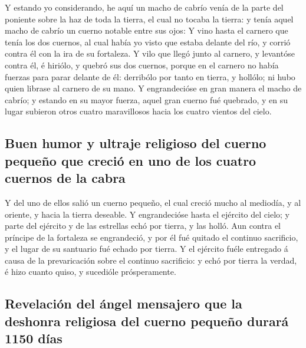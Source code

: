  Y estando yo considerando, he aquí un macho de cabrío
venía de la parte del poniente sobre la haz de toda la tierra, el cual
no tocaba la tierra: y tenía aquel macho de cabrío un cuerno notable
entre sus ojos:  Y vino hasta el carnero que tenía los dos
cuernos, al cual había yo visto que estaba delante del río, y corrió
contra él con la ira de su fortaleza.  Y vilo que llegó
junto al carnero, y levantóse contra él, é hiriólo, y quebró sus dos
cuernos, porque en el carnero no había fuerzas para parar delante de él:
derribólo por tanto en tierra, y hollólo; ni hubo quien librase al
carnero de su mano.  Y engrandecióse en gran manera el
macho de cabrío; y estando en su mayor fuerza, aquel gran cuerno fué
quebrado, y en su lugar subieron otros cuatro maravillosos hacia los
cuatro vientos del cielo.

\hypertarget{buen-humor-y-ultraje-religioso-del-cuerno-pequeuxf1o-que-creciuxf3-en-uno-de-los-cuatro-cuernos-de-la-cabra}{%
\subsection{Buen humor y ultraje religioso del cuerno pequeño que creció
en uno de los cuatro cuernos de la
cabra}\label{buen-humor-y-ultraje-religioso-del-cuerno-pequeuxf1o-que-creciuxf3-en-uno-de-los-cuatro-cuernos-de-la-cabra}}

 Y del uno de ellos salió un cuerno pequeño, el cual
creció mucho al mediodía, y al oriente, y hacia la tierra deseable.
 Y engrandecióse hasta el ejército del cielo; y parte del
ejército y de las estrellas echó por tierra, y las holló.
 Aun contra el príncipe de la fortaleza se engrandeció, y
por él fué quitado el continuo sacrificio, y el lugar de su santuario
fué echado por tierra.  Y el ejército fuéle entregado á
causa de la prevaricación sobre el continuo sacrificio: y echó por
tierra la verdad, é hizo cuanto quiso, y sucedióle prósperamente.

\hypertarget{revelaciuxf3n-del-uxe1ngel-mensajero-que-la-deshonra-religiosa-del-cuerno-pequeuxf1o-duraruxe1-1150-duxedas}{%
\subsection{Revelación del ángel mensajero que la deshonra religiosa del
cuerno pequeño durará 1150
días}\label{revelaciuxf3n-del-uxe1ngel-mensajero-que-la-deshonra-religiosa-del-cuerno-pequeuxf1o-duraruxe1-1150-duxedas}}

